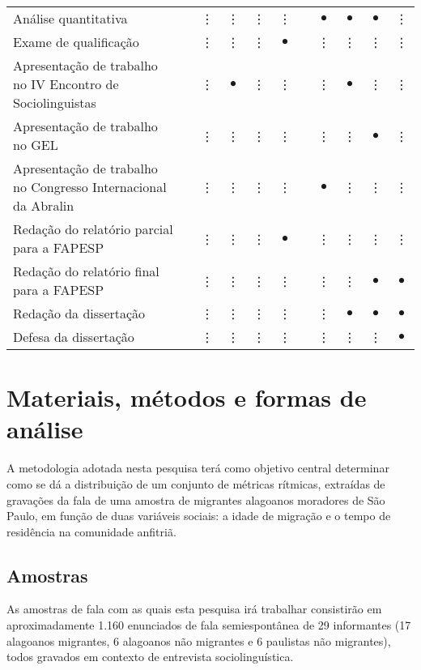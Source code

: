 \documentclass[
		a4paper,	%
		12pt,		%
		]{article}	%
\begin{document}
\begin{table}[h!]
\begin{tabular}{m{.44\linewidth}cccccccccc}
			Análise quantitativa &&\vdots&\vdots&\vdots&\vdots&&$\bullet$&$\bullet$&$\bullet$ &\vdots \\  
			\rowcolor{cinza1}
			Exame de qualificação &&\vdots&\vdots&\vdots&$\bullet$&&\vdots&\vdots&\vdots &\vdots \\  
			Apresentação de trabalho no IV Encontro de Sociolinguistas &&\vdots&$\bullet$&\vdots&\vdots&&\vdots&$\bullet$&\vdots
			&\vdots \\  
			\rowcolor{cinza1}
			Apresentação de trabalho no GEL &&\vdots&\vdots&\vdots&\vdots&&\vdots&\vdots&$\bullet$&\vdots \\  
			Apresentação de trabalho no Congresso Internacional da Abralin
			&&\vdots&\vdots&\vdots&\vdots&&$\bullet$&\vdots&\vdots&\vdots\\
			\rowcolor{cinza1}
			Redação do relatório parcial para a FAPESP &&\vdots&\vdots&\vdots&$\bullet$&&\vdots&\vdots&\vdots &\vdots \\  
			Redação do relatório final para a FAPESP &&\vdots&\vdots&\vdots&\vdots&&\vdots&\vdots&$\bullet$ & $\bullet$\\  
			\rowcolor{cinza1}
			Redação da dissertação &&\vdots&\vdots&\vdots&\vdots&&\vdots&$\bullet$&$\bullet$ &$\bullet$ \\  
			Defesa da dissertação &&\vdots&\vdots&\vdots&\vdots&&\vdots&\vdots&\vdots&$\bullet$ \\  
			\hline
			\hline
		\end{tabular}
	\end{table}
		
	\section{Materiais, métodos e formas de análise} \label{metodo}

	A metodologia adotada nesta pesquisa terá como objetivo central determinar
	como se dá a distribuição de um conjunto de métricas rítmicas, extraídas de
	gravações da fala de uma amostra de migrantes alagoanos moradores de São
	Paulo, em função de duas variáveis sociais: a idade de migração e o tempo de
	residência na comunidade anfitriã.

	\subsection{Amostras} \label{amostra}

	As amostras de fala com as quais esta pesquisa irá trabalhar consistirão em
	aproximadamente 1.160 enunciados de fala semiespontânea de 29 informantes
	(17 alagoanos migrantes, 6 alagoanos não migrantes e 6 paulistas não
	migrantes), todos gravados em contexto de entrevista sociolinguística.
\end{document}
